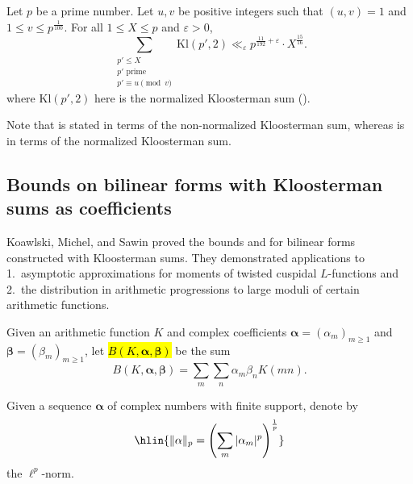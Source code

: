 \begin{theorem} \label{theorem:bound_of_sum_of_kloosterman_sums_in_small_prime_interval_in_congruence_class_by_dunn_and_zaharescu}
    Let $p$ be a prime number. Let $u,v$ be positive integers such that $(u,v) = 1$ and $1 \leq v \leq p^{\frac{1}{100}}$. For all $1 \leq X \leq p$ and $\varepsilon > 0$,
    $$\sum_{\substack{p' \leq X \\ p' \text{ prime} \\ p' \equiv u \pmod{v}}} \mathrm{Kl}(p', 2) \ll_\varepsilon p^{\frac{11}{192} + \varepsilon} \cdot X^{\frac{15}{16}}.$$
    where $\mathrm{Kl}(p', 2)$ here is the normalized Kloosterman sum ().
\end{theorem}
\begin{remark}
    Note that  is stated in terms of the non-normalized Kloosterman sum, whereas {\cite[Theorem 1.2]{dunn_zaharescu_skspap}} is in terms of the normalized Kloosterman sum.
\end{remark}

\subsection{Bounds on bilinear forms with Kloosterman sums as coefficients}

Koawlski, Michel, and Sawin \cite{kowalski_michel_sawin_bfksa} proved the bounds  and  for bilinear forms constructed with Kloosterman sums. They demonstrated applications to 1.~asymptotic approximations for moments of twisted cuspidal $L$-functions and 2.~the distribution in arithmetic progressions to large moduli of certain arithmetic functions.

\begin{notation} \label{notation:bilinear_form_with_arithmetic_function_values_as_coefficients}
    Given an arithmetic function $K$ and complex coefficients $\bm{\alpha} = (\alpha_m)_{m \geq 1}$ and $\bm{\beta} = (\beta_m)_{m \geq 1}$, let \hl{$B(K,\bm{\alpha},\bm{\beta})$} be the sum
    $$B(K,\bm{\alpha},\bm{\beta}) = \sum_m \sum_n \alpha_m \beta_n K(mn).$$
\end{notation}

\begin{notation} \label{notation:ell_p_norm_for_sequence}
    Given a sequence $\bm{\alpha}$ of complex numbers with finite support, denote by 
    $$\hlin{\|\alpha\|_p = \left( \sum_m |\alpha_m|^p \right)^{\frac{1}{p}}}$$
    the $\ell^p$-norm.
\end{notation}

